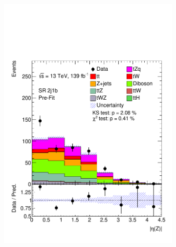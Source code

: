 \begin{figure}[h!]
\begin{subfigure}[b]{0.33\linewidth}
    \includegraphics[width=\linewidth]{ubonn-thesis/Chapters/Chapters_05/Figure/SR/SR_2j1b_Z_eta.pdf} 
  \end{subfigure} 
  \begin{subfigure}[b]{0.33\linewidth}
    \centering

\end{subfigure}
\end{figure}
